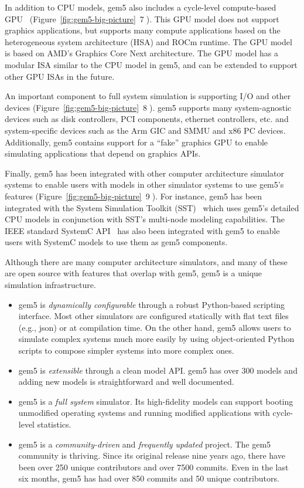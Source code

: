 In addition to CPU models, gem5 also includes a cycle-level compute-based GPU~\cite{} (Figure~\ref{fig:gem5-big-picture}~\textcircled{7}).
This GPU model does not support graphics applications, but supports many compute applications based on the heterogeneous system architecture (HSA) and ROCm runtime.
The GPU model is based on AMD's Graphics Core Next architecture.
The GPU model has a modular ISA similar to the CPU model in gem5, and can be extended to support other GPU ISAs in the future.

An important component to full system simulation is supporting I/O and other devices (Figure~\ref{fig:gem5-big-picture}~\textcircled{8}).
gem5 supports many system-agnostic devices such as disk controllers, PCI components, ethernet controllers, etc. and system-specific devices such as the Arm GIC and SMMU and x86 PC devices.
Additionally, gem5 contains support for a ``fake'' graphics GPU to enable simulating applications that depend on graphics APIs.

Finally, gem5 has been integrated with other computer architecture simulator systems to enable users with models in other simulator systems to use gem5's features (Figure~\ref{fig:gem5-big-picture}~\textcircled{9}).
For instance, gem5 has been integrated with the System Simulation Toolkit (SST)~\cite{} which uses gem5's detailed CPU models in conjunction with SST's multi-node modeling capabilities.
The IEEE standard SystemC API~\cite{} has also been integrated with gem5 to enable users with SystemC models to use them as gem5 components.

Although there are many computer architecture simulators, and many of these are open source with features that overlap with gem5, gem5 is a unique simulation infrastructure.
\begin{itemize}
    \item gem5 is \emph{dynamically configurable} through a robust Python-based scripting interface. Most other simulators are configured statically with flat text files (e.g., json) or at compilation time. On the other hand, gem5 allows users to simulate complex systems much more easily by using object-oriented Python scripts to compose simpler systems into more complex ones.
    \item gem5 is \emph{extensible} through a clean model API. gem5 has over 300 models and adding new models is straightforward and well documented.
    \item gem5 is a \emph{full system} simulator. Its high-fidelity models can support booting unmodified operating systems and running modified applications with cycle-level statistics.
    \item gem5 is a \emph{community-driven} and \emph{frequently updated} project. The gem5 community is thriving. Since its original release nine years ago, there have been over 250 unique contributors and over 7500 commits. Even in the last six months, gem5 has had over 850 commits and 50 unique contributors.
\end{itemize}

